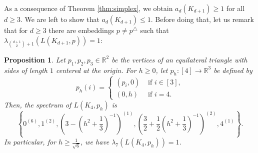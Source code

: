 \documentclass[a4paper,11pt]{article}
\theoremstyle{plain}
\newtheorem{proposition}[theorem]{\bf Proposition}
\theoremstyle{definition}
\newcommand{\Rea}{{\mathbb R}}
\begin{document}
As a consequence of Theorem \ref{thm:simplex}, we obtain $a_d(K_{d+1})\geq 1$ for all $d\geq 3$. We are left to show that $a_d(K_{d+1})\leq 1$.
Before doing that, let us remark that for $d\ge 3$ there are embeddings $p\neq p^{\triangle}$ such that $\lambda_{\binom{d+1}{2}+1}(L(K_{d+1},p))=1$:
\begin{proposition}\label{prop:nonregular}
Let $p_1,p_2,p_3\in \Rea^2$ be the vertices of an equilateral triangle with sides of length $1$ centered at the origin. For $h\geq 0$, let $p_h:[4]\to \Rea^3$ be defined by
\[
    p_h(i)=\begin{cases}
            (p_i,0) &  \text{ if } i\in[3],\\
            (0,h) & \text{ if } i=4.
        \end{cases}
\]
Then, the spectrum of $L(K_4,p_h)$ is
\[
    \left\{0^{(6)},1^{(2)},\left(3-\left(h^2+\frac{1}{3}\right)^{-1}\right)^{(1)},\left(\frac{3}{2}+\frac{1}{2}\left(h^2+\frac{1}{3}\right)^{-1}\right)^{(2)},4^{(1)}\right\}.
\]
In particular, for $h\geq \frac{1}{\sqrt{6}}$, we have $\lambda_7(L(K_4,p_h))=1$.
\end{proposition}
\end{document}
